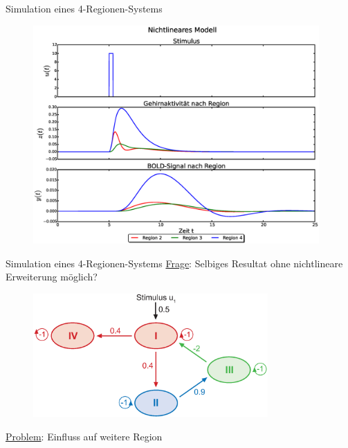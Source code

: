 \documentclass{beamer}
\begin{document}
\begin{frame}{Simulation eines 4-Regionen-Systems}
	\begin{figure}
		\vspace*{-0.33cm}
		\centering
		\includegraphics[width=0.975\textwidth]{res/hemodynamicExample-4R-autoregulation.eps}
	\end{figure}
\end{frame}

\begin{frame}{Simulation eines 4-Regionen-Systems}
 \centering
 \colorbox{maincolor!10}{\underline{Frage}: \quad Selbiges Resultat ohne nichtlineare Erweiterung möglich?}
	\begin{figure}
		\includegraphics[width=0.8\textwidth]{res/160711Autoregulation2.eps}
	\end{figure}
 \colorbox{maincolor!10}{\underline{Problem}: \quad Einfluss auf weitere Region}
\end{frame}
\end{document}
